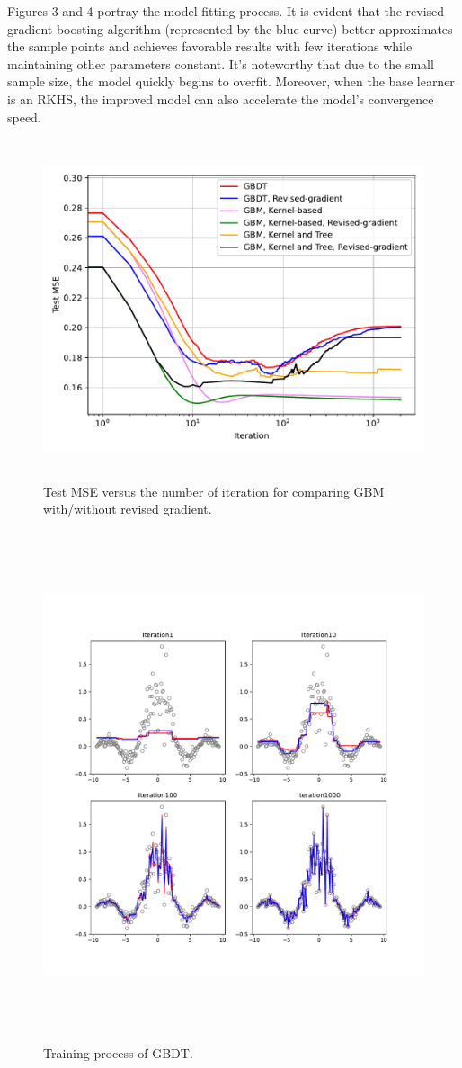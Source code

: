 Figures 3 and 4 portray the model fitting process. It is evident that the revised gradient boosting algorithm (represented by the blue curve) better approximates the sample points and achieves favorable results with few iterations while maintaining other parameters constant. It's noteworthy that due to the small sample size, the model quickly begins to overfit. Moreover, when the base learner is an RKHS, the improved model can also accelerate the model's convergence speed.
\begin{figure}[htb]
	\centering
	\includegraphics[height=10cm]{figure/test.pdf}
	\caption{Test MSE versus the number of iteration for comparing GBM with/without revised gradient.}
	\label{fig:contrast}
\end{figure}

\begin{figure}[htb]
	\centering
	\includegraphics[height=15cm]{figure/train_process_1.pdf}
	\caption{Training process of GBDT.}
\end{figure}

